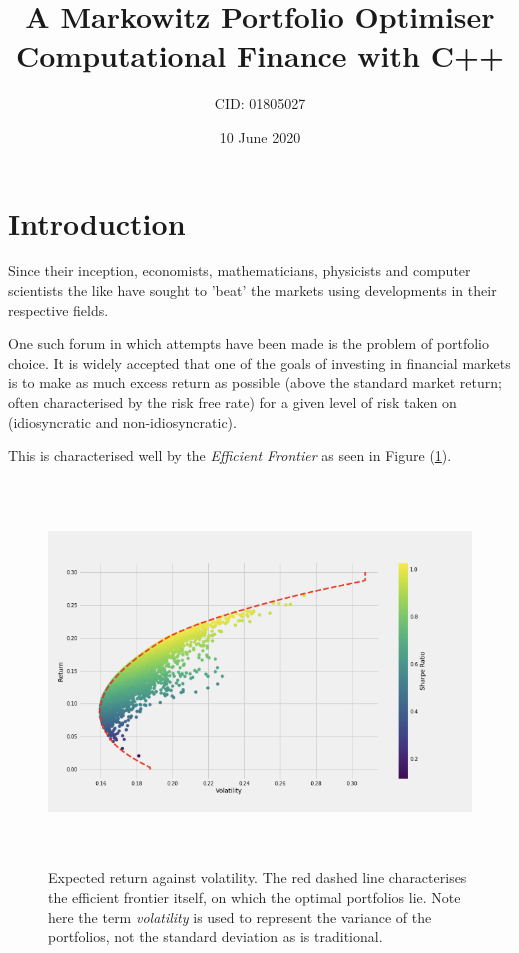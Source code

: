 \documentclass{article}
\title{%
	A Markowitz Portfolio Optimiser \\
	\large Computational Finance with C++ \\}
\author{CID: 01805027}
\date{10 June 2020}
\begin{document}
	
	
	
\renewcommand*{\arraystretch}{1.5}

\maketitle
\section{Introduction} 
\label{sec:introduction}

Since their inception, economists, mathematicians, physicists and computer scientists the like have sought to 'beat' the markets using developments in their respective fields.

One such forum in which attempts have been made is the problem of portfolio choice. It is widely accepted that one of the goals of investing in financial markets is to make as much excess return as possible (above the standard market return; often characterised by the risk free rate) for a given level of risk taken on (idiosyncratic and non-idiosyncratic). 

This is characterised well by the \textit{Efficient Frontier} as seen in Figure (\ref{efficient_frontier}).


\begin{figure}[H]
	\centerline{\includegraphics[width=\textwidth,height=4in]{figures/EF.png}}
	\label{efficient_frontier}
	\caption{Expected return against volatility. The red dashed line characterises the efficient frontier itself, on which the optimal portfolios lie. \cite{ef_medium} Note here the term \textit{volatility} is used to represent the variance of the portfolios, not the standard deviation as is traditional.}
\end{figure}
\end{document}
